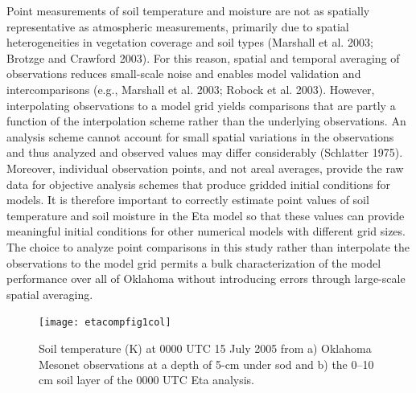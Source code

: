 \documentclass[twocolumn]{article}
\begin{document}
Point measurements of soil temperature and moisture are not as spatially representative as atmospheric measurements, primarily due to spatial heterogeneities in vegetation coverage and soil types (Marshall et al. 2003; Brotzge and Crawford 2003).  For this reason, spatial and temporal averaging of observations reduces small-scale noise and enables model validation and intercomparisons (e.g., Marshall et al. 2003; Robock et al. 2003).  However, interpolating observations to a model grid yields comparisons that are partly a function of the interpolation scheme rather than the underlying observations.  An analysis scheme cannot account for small spatial variations in the observations and thus analyzed and observed values may differ considerably (Schlatter 1975).  Moreover, individual observation points, and not areal averages, provide the raw data for objective analysis schemes that produce gridded initial conditions for models.  It is therefore important to correctly estimate point values of soil temperature and soil moisture in the Eta model so that these values can provide meaningful initial conditions for other numerical models with different grid sizes.  The choice to analyze point comparisons in this study rather than interpolate the observations to the model grid permits a bulk characterization of the model performance over all of Oklahoma without introducing errors through large-scale spatial averaging.
\begin{figure}[!t] %
\begin{center}
\texttt{[image: etacompfig1col]}
\end{center}
\caption{
Soil temperature (K) at 0000 UTC 15 July 2005 from a) Oklahoma Mesonet observations
at a depth of 5-cm under sod and b) the 0--10 cm soil layer of the 0000 UTC Eta
analysis.
\label{etacompfig1}
}
\end{figure}
\end{document}
